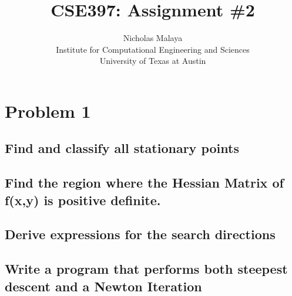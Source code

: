 \documentclass{article}
\title{\bf{CSE397: Assignment \#2}}
\author{Nicholas Malaya \\ Institute for Computational Engineering and Sciences \\ University of Texas at Austin} \date{}
\begin{document}
\maketitle

\newpage
\section{Problem 1}

\subsection{Find and classify all stationary points}

\subsection{Find the region where the Hessian Matrix of f(x,y) is positive definite.}

\subsection{Derive expressions for the search directions}

\subsection{Write a program that performs both steepest descent and a
  Newton Iteration}






\end{document}
